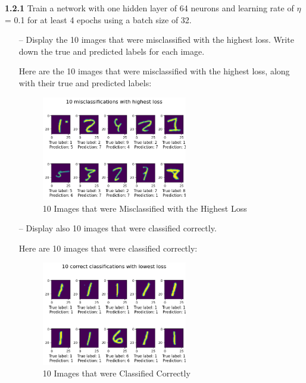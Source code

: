 \documentclass[a4paper, 12pt]{article}
\begin{document}
\textcolor{myblue}{
\textbf{1.2.1} Train a network with one hidden layer of 64 neurons and learning rate of $\eta$ = 0.1 for at least 4 
epochs using a batch size of 32. 
}

\begin{itemize}
    
    \item[--] \textcolor{myblue}{Display the 10 images that were misclassified with the highest loss. 
    Write down the true and predicted labels for each image.}

    \item[]
    Here are the 10 images that were misclassified with the highest loss, along with their true and predicted labels:
        
    \begin{figure}[H]
        \centering
        \includegraphics[width=0.6\textwidth]{../figs/1-2-1--1.png}   
        \caption{10 Images that were Misclassified with the Highest Loss} 
        \label{fig:scenario1}
    \end{figure}
    

    
    \item[--] \textcolor{myblue}{Display also 10 images that were classified correctly. }
    \item[] 
        Here are 10 images that were classified correctly:
    \begin{figure}[H]
        \centering
        \includegraphics[width=0.6\textwidth]{../figs/1-2-1--2.png}
        \caption{10 Images that were Classified Correctly}
        \label{fig:scenario1}
    \end{figure}
    



\end{itemize}
\end{document}
